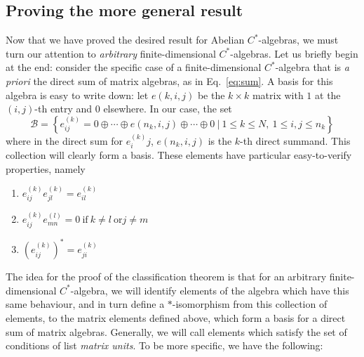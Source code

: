 \documentclass[aps,pra,showpacs,notitlepage,onecolumn,superscriptaddress,nofootinbib]{revtex4-1}
\theoremstyle{definition}
\begin{document}
\subsection{Proving the more general result}

\noindent Now that we have proved the desired result for Abelian $C^{*}$-algebras, we must turn our attention to \emph{arbitrary} finite-dimensional $C^{*}$-algebras.
Let us briefly begin at the end: consider the specific case of a finite-dimensional $C^{*}$-algebra that is \emph{a priori} the direct sum of matrix algebras, as in Eq.~\eqref{eq:sum}.
A basis for this algebra is easy to write down: let $e(k, i, j)$ be the $k \times k$ matrix with $1$ at the $(i, j)$-th entry and $0$ elsewhere. In our case, the set
\begin{equation}
  \mathcal{B} = \left\{ e_{ij}^{(k)} = 0 \oplus \cdots \oplus e(n_k, i, j) \oplus \cdots \oplus 0 \ | \ 1 \leq k \leq N, \ 1 \leq i, j \leq n_k \right\}
\end{equation}
where in the direct sum for $e^{(k)}_ij$, $e(n_k, i, j)$ is the $k$-th direct summand. This collection will clearly form a basis. These elements have particular easy-to-verify properties, namely
\begin{enumerate}
\item $e^{(k)}_{ij} e^{(k)}_{jl} = e^{(k)}_{il}$
\item $e_{ij}^{(k)} e_{mn}^{(l)} = 0 \ \text{if} \ k \neq l \ \text{or} j \neq m$
  \item $(e_{ij}^{(k)})^{*} = e_{ji}^{(k)}$
\end{enumerate}
The idea for the proof of the classification theorem is that for an arbitrary finite-dimensional $C^{*}$-algebra, we will identify elements of the algebra which have
this same behaviour, and in turn define a $*$-isomorphism from this collection of elements, to the matrix elements defined above, which form a basis for a direct sum
of matrix algebras. Generally, we will call elements which satisfy the set of conditions of list \emph{matrix units}. To be more specific, we have the following:
\end{document}
